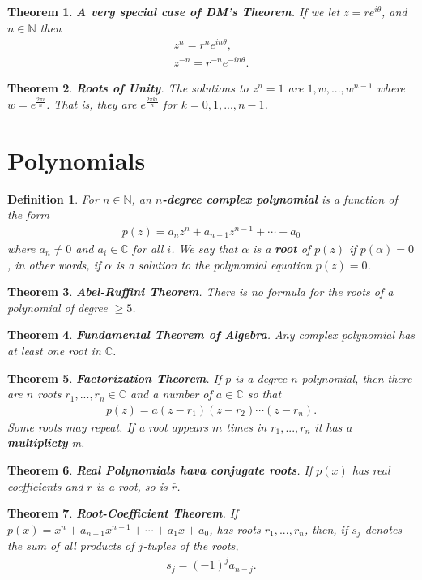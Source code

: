 \documentclass{article}
\theoremstyle{sltheorem}
\newtheorem{definition}{Definition}[section]
\newtheorem{theorem}{Theorem}[section]
\newcommand{\N}{\mathbb{N}}
\renewcommand{\C}{\mathbb{C}}
\newcommand*\B[1]{\textbf{#1}}
\begin{document}
\begin{theorem}
    \B{A very special case of DM's Theorem}. If we let $z=re^{i\theta}$, and $n\in\N$ then
    \begin{align*}
        z^n = r^ne^{in\theta},\\
        z^{-n} = r^{-n}e^{-in\theta}.
    \end{align*}
\end{theorem}
\begin{theorem}
    \B{Roots of Unity}. The solutions to $z^n=1$ are $1,w,...,w^{n-1}$ where $w=e^{\frac{2\pi i}{n}}$. That is, they are $e^{\frac{2\pi ki}{n}}$ for $k=0,1,...,n-1$.
\end{theorem}
\section{Polynomials}
\begin{definition}
    For $n\in\N$, an \B{$n$-degree complex polynomial} is a function of the form
    \begin{align*}
        p(z)=a_nz^n+a_{n-1}z^{n-1}+\cdots+a_0
    \end{align*}
    where $a_n\not=0$ and $a_i\in\C$ for all $i$. We say that $\alpha$ is a \B{root} of $p(z)$ if $p(\alpha)=0$, in other words, if $\alpha$ is a solution to the polynomial equation $p(z)=0$.
\end{definition}
\begin{theorem}
    \B{Abel-Ruffini Theorem}. There is no formula for the roots of a polynomial of degree $\geq 5$.
\end{theorem}
\begin{theorem}
    \B{Fundamental Theorem of Algebra}. Any complex polynomial has at least one root in $\C$.
\end{theorem}
\begin{theorem}
    \B{Factorization Theorem}. If $p$ is a degree $n$ polynomial, then there are $n$ roots $r_1,...,r_n\in\C$ and a number of $a\in\C$ so that
    \begin{align*}
        p(z)=a(z-r_1)(z-r_2)\cdots(z-r_n).
    \end{align*}
    Some roots may repeat. If a root appears $m$ times in $r_1, ..., r_n$ it has a \B{multiplicty} m.
\end{theorem}
\begin{theorem}
    \B{Real Polynomials hava conjugate roots}. If $p(x)$ has real coefficients and $r$ is a root, so is $\bar{r}$.
\end{theorem}
\begin{theorem}
    \B{Root-Coefficient Theorem}. If $p(x)=x^n+a_{n-1}x^{n-1}+\cdots+a_1x+a_0$, has roots $r_1, ..., r_n$, then, if $s_j$ denotes the sum of all products of $j$-tuples of the roots,
    \begin{align*}
        s_j=(-1)^ja_{n-j}.
    \end{align*}
\end{theorem}
\end{document}
